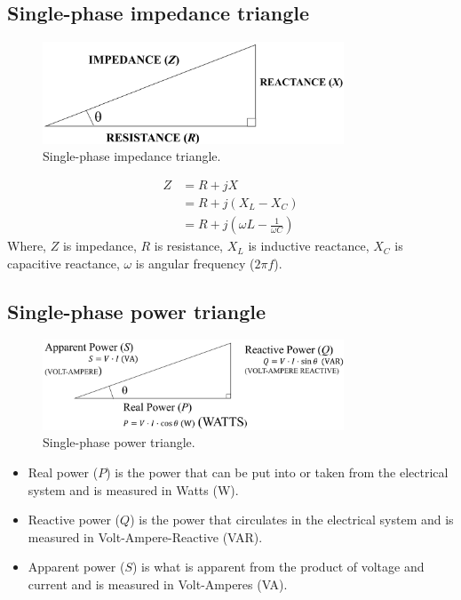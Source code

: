 \documentclass[class=report, crop=false, 12pt,a4paper]{standalone}
\begin{document}
\subsection{Single-phase impedance triangle}
\begin{figure}[H]
	\centering
	\includegraphics[width = 0.8\textwidth]{../img/figure9.png}
	\caption{Single-phase impedance triangle.}
\end{figure}
\begin{align}
	Z & = R + jX                                          \\
	  & = R + j\left(X_L - X_C\right)                     \\
	  & = R + j\left(\omega L - \frac{1}{\omega C}\right)
\end{align}
Where, $Z$ is impedance, $R$ is resistance, $X_L$ is inductive reactance, $X_C$ is capacitive reactance, $\omega$ is angular frequency ($2\pi f$).
\subsection{Single-phase power triangle}
\begin{figure}[H]
	\centering
	\includegraphics[width = 0.8\textwidth]{../img/figure10.png}
	\caption{Single-phase power triangle.}
\end{figure}
\begin{itemize}
	\item Real power ($P$) is the power that can be put into or taken from the electrical system and is measured in Watts (\si{\watt}).
	\item Reactive power ($Q$) is the power that circulates in the electrical system and is measured in Volt-Ampere-Reactive (VAR).
	\item Apparent power ($S$) is what is apparent from the product of voltage and current and is measured in Volt-Amperes (VA).
\end{itemize}
\end{document}
